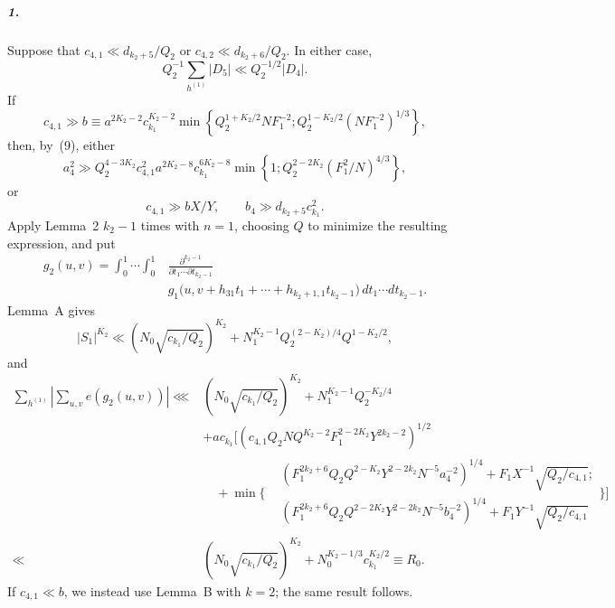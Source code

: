 \documentclass[10pt]{article}
\begin{document}
\subparagraph{1.}
Suppose that $c_{4,1}\ll d_{k_2+5}/Q_2$ or $c_{4,2}\ll d_{k_2+6}/Q_2$. In either case,
\[
  Q_2^{-1}\sum_{h^{(1)}}|D_5|\ll Q_2^{-1/2}|D_4|.
\]
If
\[
  c_{4,1}\gg b\equiv
  a^{2K_2-2}c_{k_1}^{K_2-2}
  \min\left\{
    Q_2^{1+K_2/2}NF_1^{-2};
    Q_2^{1-K_2/2}(NF_1^{-2})^{1/3}
  \right\},
\]
then, by~(9), either
\[
  a_4^2\gg
  Q_2^{4-3K_2}c_{4,1}^2a^{2K_2-8}c_{k_1}^{6K_2-8}
  \min\left\{1;
    Q_2^{2-2K_2}(F_1^2/N)^{4/3}
  \right\},
\]
or
\[
  c_{4,1}\gg bX/Y,
  \qquad b_4\gg d_{k_2+5}c_{k_1}^2.
\]
Apply Lemma~2 $k_2-1$ times with $n=1$, choosing $Q$ to minimize the resulting expression, and put
\[
\begin{aligned}
  g_2(u,v)=\int_0^1\!\cdots\!\int_0^1
  &\frac{\partial^{k_2-1}}{\partial t_1\cdots\partial t_{k_2-1}}\\
  &g_1\bigl(u,v+h_{31}t_1+\cdots+h_{k_2+1,1}t_{k_2-1}\bigr)
  \,dt_1\cdots dt_{k_2-1}.
\end{aligned}
\]
Lemma~A gives
\[
  |S_1|^{K_2}
  \ll\left(N_0\sqrt{c_{k_1}/Q_2}\right)^{K_2}
  +N_1^{K_2-1}Q_2^{(2-K_2)/4}Q^{1-K_2/2},
\]
and
\[
\begin{aligned}
  \sum_{h^{(1)}}\left|\sum_{u,v}e(g_2(u,v))\right|
  \lll{}&\left(N_0\sqrt{c_{k_1}/Q_2}\right)^{K_2}
  +N_1^{K_2-1}Q_2^{-K_2/4}\\
  &+ac_{k_1}\Bigg[
    \left(c_{4,1}Q_2NQ^{K_2-2}F_1^{2-2K_2}Y^{2k_2-2}\right)^{1/2}\\
  &\quad+\min\Bigg\{
    \begin{aligned}
      &\left(F_1^{2k_2+6}Q_2Q^{2-K_2}Y^{2-2k_2}N^{-5}a_4^{-2}\right)^{1/4}
       +F_1X^{-1}\sqrt{Q_2/c_{4,1}};\\
      &\left(F_1^{2k_2+6}Q_2Q^{2-2K_2}Y^{2-2k_2}N^{-5}b_4^{-2}\right)^{1/4}
       +F_1Y^{-1}\sqrt{Q_2/c_{4,1}}
    \end{aligned}
    \Bigg\}\Bigg]\\
  \ll{}&\left(N_0\sqrt{c_{k_1}/Q_2}\right)^{K_2}
    +N_0^{K_2-1/3}c_{k_1}^{K_2/2}
    \equiv R_0.
\end{aligned}
\]
If $c_{4,1}\ll b$, we instead use Lemma~B with $k=2$; the same result follows.
\end{document}
